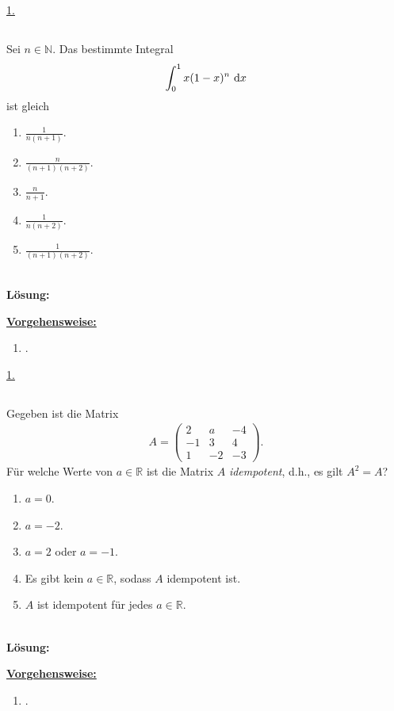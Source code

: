 \underline{1. }\\

\newpage
\subsection*{}
Sei $ n \in \mathbb{N} $.
Das bestimmte Integral
\begin{align*}
	\int_0^1
	x(1-x)^n
	\ \text{\rmfamily d} x
\end{align*}
ist gleich
\renewcommand{\labelenumi}{(\alph{enumi})}
\begin{enumerate}
	\item 
	$\frac{1}{n(n+1)}$.
	\item
	$\frac{n}{(n+1)(n+2)}$.
	\item
	$\frac{n}{n+1}$.
	\item
	$\frac{1}{n(n+2)}$.
	\item
	$\frac{1}{(n+1)(n+2)}$.	
\end{enumerate}
\ \\
\textbf{Lösung:}
\begin{mdframed}
\underline{\textbf{Vorgehensweise:}}
\renewcommand{\labelenumi}{\theenumi.}
\begin{enumerate}
\item .
\end{enumerate}
\end{mdframed}
\underline{1. }\\
\newpage

\subsection*{}
Gegeben ist die Matrix
\begin{align*}
	A
	=
	\begin{pmatrix}
		2 & a & -4 \\
		-1 & 3 & 4\\
		1 & -2 & -3
	\end{pmatrix}.
\end{align*}
Für welche Werte von $ a \in \mathbb{R} $ ist die Matrix $ A $
\textit{idempotent}, d.h., es gilt $ A^2 = A $?
\renewcommand{\labelenumi}{(\alph{enumi})}
\begin{enumerate}
	\item 
	$ a= 0 $.
	\item 
	$ a= -2 $.
	\item
	$ a= 2 $ oder $ a= -1 $.
	\item
	Es gibt kein $ a \in \mathbb{R} $, sodass $ A $ idempotent ist.
	\item
	$ A $ ist idempotent für jedes $ a \in \mathbb{R} $.
\end{enumerate}
\ \\
\textbf{Lösung:}
\begin{mdframed}
\underline{\textbf{Vorgehensweise:}}
\renewcommand{\labelenumi}{\theenumi.}
\begin{enumerate}
\item .
\end{enumerate}
\end{mdframed}

